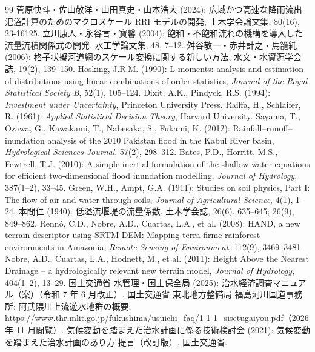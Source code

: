 \documentclass[a4paper,10pt]{ltjsarticle}
\begin{document}
\begin{thebibliography}{99}\small
{} 菅原快斗・佐山敬洋・山田真史・山本浩大 (2024): 広域かつ高速な降雨流出氾濫計算のためのマクロスケール RRI モデルの開発, 土木学会論文集, 80(16), 23-16125.
 立川康人・永谷言・寶馨 (2004): 飽和・不飽和流れの機構を導入した流量流積関係式の開発, 水工学論文集, 48, 7--12.
 舛谷敬一・赤井計之・馬籠純 (2006): 格子状擬河道網のスケール変換に関する新しい方法, 水文・水資源学会誌, 19(2), 139--150.
 Hosking, J.R.M. (1990): L-moments: analysis and estimation of distributions using linear combinations of order statistics, \textit{Journal of the Royal Statistical Society B}, 52(1), 105--124.
 Dixit, A.K., Pindyck, R.S. (1994): \textit{Investment under Uncertainty}, Princeton University Press.
 Raiffa, H., Schlaifer, R. (1961): \textit{Applied Statistical Decision Theory}, Harvard University.
 Sayama, T., Ozawa, G., Kawakami, T., Nabesaka, S., Fukami, K. (2012): Rainfall–runoff–inundation analysis of the 2010 Pakistan flood in the Kabul River basin, \textit{Hydrological Sciences Journal}, 57(2), 298--312.
 Bates, P.D., Horritt, M.S., Fewtrell, T.J. (2010): A simple inertial formulation of the shallow water equations for efficient two-dimensional flood inundation modelling, \textit{Journal of Hydrology}, 387(1--2), 33--45.
 Green, W.H., Ampt, G.A. (1911): Studies on soil physics, Part I: The flow of air and water through soils, \textit{Journal of Agricultural Science}, 4(1), 1--24.
 本間仁 (1940): 低溢流堰堤の流量係数, 土木学会誌, 26(6), 635--645; 26(9), 849--862.
 Rennó, C.D., Nobre, A.D., Cuartas, L.A., et al. (2008): HAND, a new terrain descriptor using SRTM-DEM: Mapping terra-firme rainforest environments in Amazonia, \textit{Remote Sensing of Environment}, 112(9), 3469--3481.
 Nobre, A.D., Cuartas, L.A., Hodnett, M., et al. (2011): Height Above the Nearest Drainage -- a hydrologically relevant new terrain model, \textit{Journal of Hydrology}, 404(1--2), 13--29.
 国土交通省 水管理・国土保全局 (2025): 治水経済調査マニュアル（案）（令和 7 年 6 月改正）.
 国土交通省 東北地方整備局 福島河川国道事務所: 阿武隈川上流遊水地群の概要, \url{https://www.thr.mlit.go.jp/fukushima/usuichi_faq/1-1-1_sisetugaiyou.pdf}（2026 年 11 月閲覧）.
 気候変動を踏まえた治水計画に係る技術検討会 (2021): 気候変動を踏まえた治水計画のあり方 提言（改訂版）, 国土交通省.

\end{thebibliography}
\end{document}
